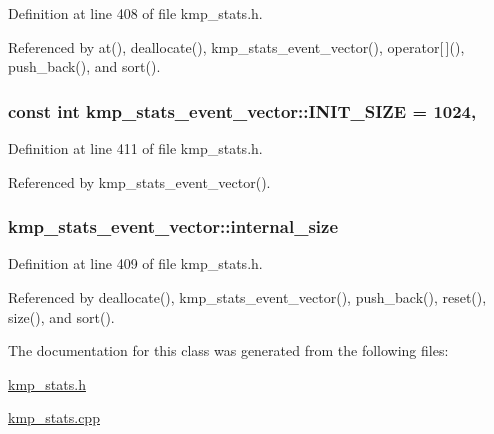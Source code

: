 Definition at line 408 of file kmp\-\_\-stats.\-h.



Referenced by at(), deallocate(), kmp\-\_\-stats\-\_\-event\-\_\-vector(), operator\mbox{[}$\,$\mbox{]}(), push\-\_\-back(), and sort().

\hypertarget{classkmp__stats__event__vector_a2bf0b8c1003e5ef544127e00fe7280db}{
\subsubsection[{I\-N\-I\-T\-\_\-\-S\-I\-Z\-E}]{\setlength{\rightskip}{0pt plus 5cm}const {\bf int} kmp\-\_\-stats\-\_\-event\-\_\-vector\-::\-I\-N\-I\-T\-\_\-\-S\-I\-Z\-E = 1024\hspace{0.3cm}{\ttfamily [static]}, {\ttfamily [private]}}}\label{classkmp__stats__event__vector_a2bf0b8c1003e5ef544127e00fe7280db}


Definition at line 411 of file kmp\-\_\-stats.\-h.



Referenced by kmp\-\_\-stats\-\_\-event\-\_\-vector().

\hypertarget{classkmp__stats__event__vector_ab81d47b204c28205c304661fadc92009}{
\subsubsection[{internal\-\_\-size}]{ kmp\-\_\-stats\-\_\-event\-\_\-vector\-::internal\-\_\-size\hspace{0.3cm}{\ttfamily [private]}}}\label{classkmp__stats__event__vector_ab81d47b204c28205c304661fadc92009}


Definition at line 409 of file kmp\-\_\-stats.\-h.



Referenced by deallocate(), kmp\-\_\-stats\-\_\-event\-\_\-vector(), push\-\_\-back(), reset(), size(), and sort().



The documentation for this class was generated from the following files\-:\begin{DoxyCompactItemize}
\item 
\hyperlink{kmp__stats_8h}{kmp\-\_\-stats.\-h}\item 
\hyperlink{kmp__stats_8cpp}{kmp\-\_\-stats.\-cpp}\end{DoxyCompactItemize}

